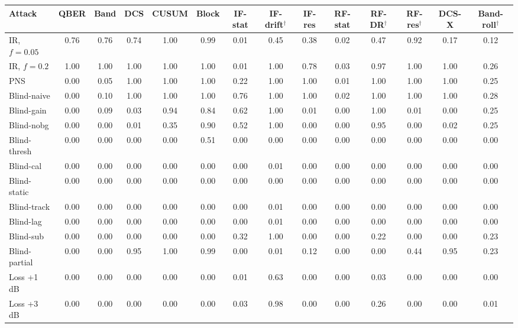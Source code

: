 \begin{tabular}{lccccccccccccc}
\hline
Attack & QBER & Band & DCS & CUSUM & Block & IF-stat & IF-drift$^\dagger$ & IF-res & RF-stat & RF-DR$^\dagger$ & RF-res$^\dagger$ & DCS-X & Band-roll$^\dagger$\\
\hline
IR, $f=0.05$ & 0.76 & 0.76 & 0.74 & 1.00 & 0.99 & 0.01 & 0.45 & 0.38 & 0.02 & 0.47 & 0.92 & 0.17 & 0.12\\
IR, $f=0.2$ & 1.00 & 1.00 & 1.00 & 1.00 & 1.00 & 0.01 & 1.00 & 0.78 & 0.03 & 0.97 & 1.00 & 1.00 & 0.26\\
PNS & 0.00 & 0.05 & 1.00 & 1.00 & 1.00 & 0.22 & 1.00 & 1.00 & 0.01 & 1.00 & 1.00 & 1.00 & 0.25\\
Blind-naive & 0.00 & 0.10 & 1.00 & 1.00 & 1.00 & 0.76 & 1.00 & 1.00 & 0.02 & 1.00 & 1.00 & 1.00 & 0.28\\
Blind-gain & 0.00 & 0.09 & 0.03 & 0.94 & 0.84 & 0.62 & 1.00 & 0.01 & 0.00 & 1.00 & 0.01 & 0.00 & 0.25\\
Blind-nobg & 0.00 & 0.00 & 0.01 & 0.35 & 0.90 & 0.52 & 1.00 & 0.00 & 0.00 & 0.95 & 0.00 & 0.02 & 0.25\\
Blind-thresh & 0.00 & 0.00 & 0.00 & 0.00 & 0.51 & 0.00 & 0.00 & 0.00 & 0.00 & 0.00 & 0.00 & 0.00 & 0.00\\
Blind-cal & 0.00 & 0.00 & 0.00 & 0.00 & 0.00 & 0.00 & 0.01 & 0.00 & 0.00 & 0.00 & 0.00 & 0.00 & 0.00\\
Blind-static & 0.00 & 0.00 & 0.00 & 0.00 & 0.00 & 0.00 & 0.00 & 0.00 & 0.00 & 0.00 & 0.00 & 0.00 & 0.00\\
Blind-track & 0.00 & 0.00 & 0.00 & 0.00 & 0.00 & 0.00 & 0.01 & 0.00 & 0.00 & 0.00 & 0.00 & 0.00 & 0.00\\
Blind-lag & 0.00 & 0.00 & 0.00 & 0.00 & 0.00 & 0.00 & 0.01 & 0.00 & 0.00 & 0.00 & 0.00 & 0.00 & 0.00\\
Blind-sub & 0.00 & 0.00 & 0.00 & 0.00 & 0.00 & 0.32 & 1.00 & 0.00 & 0.00 & 0.22 & 0.00 & 0.00 & 0.23\\
Blind-partial & 0.00 & 0.00 & 0.95 & 1.00 & 0.99 & 0.00 & 0.01 & 0.12 & 0.00 & 0.00 & 0.44 & 0.95 & 0.23\\
Loss +1 dB & 0.00 & 0.00 & 0.00 & 0.00 & 0.00 & 0.01 & 0.63 & 0.00 & 0.00 & 0.03 & 0.00 & 0.00 & 0.00\\
Loss +3 dB & 0.00 & 0.00 & 0.00 & 0.00 & 0.00 & 0.03 & 0.98 & 0.00 & 0.00 & 0.26 & 0.00 & 0.00 & 0.01\\
\hline
\end{tabular}